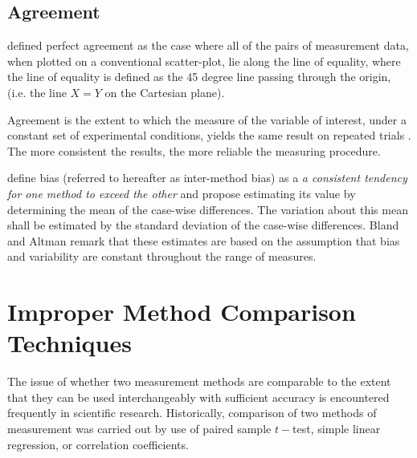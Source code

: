 \documentclass[12pt, a4paper]{report}
\theoremstyle{plain}
\theoremstyle{definition}
\theoremstyle{remark}
\begin{document}
	
	
	\subsection{Agreement}
	\citet{BA86} defined perfect agreement as the case where all of the pairs of measurement data, when plotted on a conventional scatter-plot, lie along the line of equality, where the line of equality is defined as the 45 degree line passing through the origin, (i.e. the line $X=Y$ on the Cartesian plane). 
	
	
	
	Agreement is the extent to which the measure of the variable of interest, under a constant set of experimental conditions, yields the same result on repeated trials \citep{sanchez1999}. The more consistent the results, the more reliable the measuring procedure.
	
	
	
	
	
\citet{BA83} define bias (referred to hereafter as inter-method bias) as a \emph{a consistent tendency for one method to exceed the other} and propose estimating its value by determining the mean of the case-wise differences. 
	The variation about this mean shall be estimated by the  standard deviation of the case-wise differences. Bland and Altman remark that these estimates are based on the assumption that bias and variability are constant throughout the
	range of measures.
	
	
	
	
	
	
	\section{Improper Method Comparison Techniques}
The issue of whether two measurement methods are comparable to the extent that they can be used interchangeably with sufficient accuracy is encountered frequently in scientific research. Historically, comparison of two methods of measurement was carried
	out by use of paired sample $t-$test, 
	simple linear regression, or correlation coefficients. 
	
\end{document}
